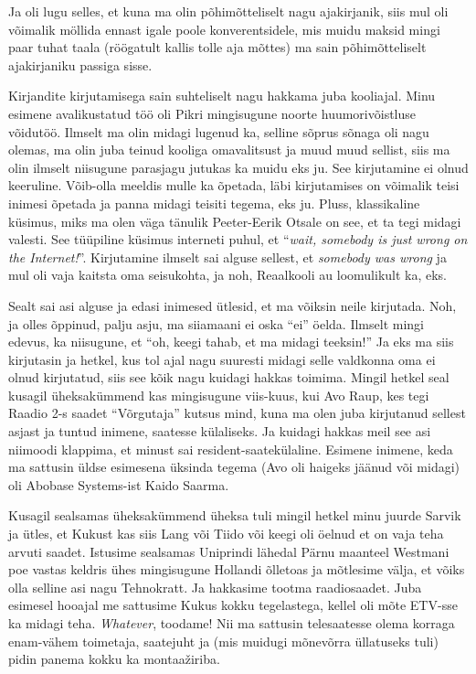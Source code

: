 Ja oli lugu selles, et kuna ma olin põhimõtteliselt nagu ajakirjanik, siis mul oli võimalik möllida ennast igale poole konverentsidele, mis muidu maksid mingi paar tuhat taala (röögatult kallis tolle aja mõttes) ma sain põhimõtteliselt  ajakirjaniku passiga sisse. 


Kirjandite kirjutamisega sain suhteliselt nagu hakkama juba kooliajal. Minu esimene avalikustatud töö oli Pikri mingisugune noorte huumorivõistluse võidutöö. Ilmselt ma olin midagi lugenud ka,  selline sõprus sõnaga oli nagu olemas, ma olin juba teinud  kooliga omavalitsust ja muud muud sellist, siis ma olin ilmselt niisugune parasjagu jutukas ka muidu eks ju. See kirjutamine ei olnud keeruline. Võib-olla meeldis mulle ka õpetada,  läbi kirjutamises on võimalik teisi inimesi õpetada ja panna midagi teisiti tegema, eks ju. Pluss, klassikaline küsimus, miks ma olen väga tänulik Peeter-Eerik Otsale on see, et ta tegi midagi valesti. See tüüpiline küsimus interneti puhul, et \enquote{\emph{wait, somebody is just wrong on the Internet!}}. Kirjutamine ilmselt sai alguse sellest, et \emph{somebody was wrong} ja mul oli vaja kaitsta oma  seisukohta, ja noh, Reaalkooli au loomulikult ka, eks. 

Sealt sai asi alguse ja edasi inimesed ütlesid, et ma võiksin neile kirjutada. Noh, ja  olles õppinud, palju asju, ma siiamaani ei oska \enquote{ei} öelda. Ilmselt mingi edevus, ka niisugune, et \enquote{oh, keegi tahab, et ma midagi teeksin!} Ja eks ma siis kirjutasin ja hetkel, kus tol ajal nagu suuresti midagi selle valdkonna oma ei olnud kirjutatud, siis see kõik nagu kuidagi hakkas toimima. Mingil hetkel seal kusagil  üheksakümmend kas mingisugune viis-kuus, kui Avo Raup, kes tegi Raadio 2-s saadet \enquote{Võrgutaja} kutsus mind, kuna ma olen juba kirjutanud sellest asjast ja tuntud inimene, saatesse külaliseks. Ja kuidagi hakkas meil see asi niimoodi klappima, et minust sai resident-saatekülaline. Esimene inimene, keda ma sattusin üldse esimesena üksinda tegema  (Avo oli haigeks jäänud või midagi) oli Abobase Systems-ist Kaido Saarma. 

Kusagil sealsamas üheksakümmend üheksa tuli mingil hetkel minu juurde Sarvik ja ütles, et Kukust kas siis Lang või Tiido või keegi oli öelnud et on vaja teha arvuti saadet. Istusime sealsamas Uniprindi lähedal Pärnu maanteel Westmani poe vastas keldris ühes mingisugune Hollandi õlletoas ja mõtlesime välja, et võiks olla selline asi nagu Tehnokratt. Ja hakkasime tootma raadiosaadet. Juba esimesel hooajal me sattusime Kukus kokku tegelastega, kellel oli mõte ETV-sse ka midagi teha. \emph{Whatever}, toodame! Nii ma sattusin telesaatesse olema korraga enam-vähem toimetaja, saatejuht ja (mis muidugi mõnevõrra üllatuseks tuli) pidin panema kokku ka montaažiriba.

